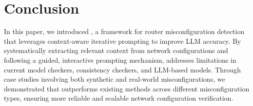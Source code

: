 \section{Conclusion}
\label{sec:conclusion}

In this paper, we introduced \sysname{}, a framework for router misconfiguration detection that leverages context-aware iterative prompting to improve LLM accuracy. By systematically extracting relevant context from network configurations
and following a guided, interactive prompting mechanism, \sysname{} addresses limitations in current model checkers, consistency checkers, and LLM-based models. Through case studies involving both synthetic and real-world misconfigurations, we demonstrated that \sysname{} outperforms existing methods across different misconfiguration types, ensuring more reliable and scalable network configuration verification.